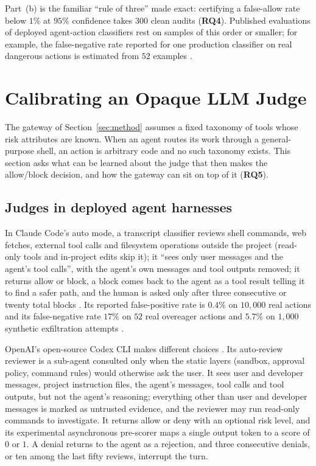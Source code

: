 \documentclass[11pt]{article}
\newcommand{\RQ}[1]{\textbf{RQ#1}}
\begin{document}
Part~(b) is the familiar ``rule of three'' made exact: certifying a
false-allow rate below $1\%$ at $95\%$ confidence takes $300$ clean audits
(\RQ4). Published evaluations of deployed agent-action classifiers rest on
samples of this order or smaller; for example, the false-negative rate
reported for one production classifier on real dangerous actions is
estimated from $52$ examples \citep{hughes2026automode}.

\section{Calibrating an Opaque LLM Judge}\label{sec:judge}

The gateway of Section~\ref{sec:method} assumes a fixed taxonomy of tools
whose risk attributes are known. When an agent routes its work through a
general-purpose shell, an action is arbitrary code and no such taxonomy
exists. This section asks what can be learned about the judge that then makes
the allow/block decision, and how the gateway can sit on top of it (\RQ5).

\subsection{Judges in deployed agent harnesses}\label{sec:judge-deployed}

In Claude Code's auto mode, a transcript classifier reviews shell commands,
web fetches, external tool calls and filesystem operations outside the
project (read-only tools and in-project edits skip it); it ``sees only user
messages and the agent's tool calls'', with the agent's own messages and tool
outputs removed; it returns allow or block, a block comes back to the agent as
a tool result telling it to find a safer path, and the human is asked only
after three consecutive or twenty total blocks \citep{hughes2026automode}. Its
reported false-positive rate is $0.4\%$ on $10{,}000$ real actions and its
false-negative rate $17\%$ on $52$ real overeager actions and $5.7\%$ on
$1{,}000$ synthetic exfiltration attempts \citep{hughes2026automode}.

OpenAI's open-source Codex CLI makes different choices
\citep{openai2026codex}. Its auto-review reviewer is a sub-agent consulted
only when the static layers (sandbox, approval policy, command rules) would
otherwise ask the user. It sees user and developer messages, project
instruction files, the agent's messages, tool calls and tool outputs, but not
the agent's reasoning; everything other than user and developer messages is
marked as untrusted evidence, and the reviewer may run read-only commands to
investigate. It returns allow or deny with an optional risk level, and its
experimental asynchronous pre-scorer maps a single output token to a score of
$0$ or $1$. A denial returns to the agent as a rejection, and three
consecutive denials, or ten among the last fifty reviews, interrupt the turn.
\end{document}
